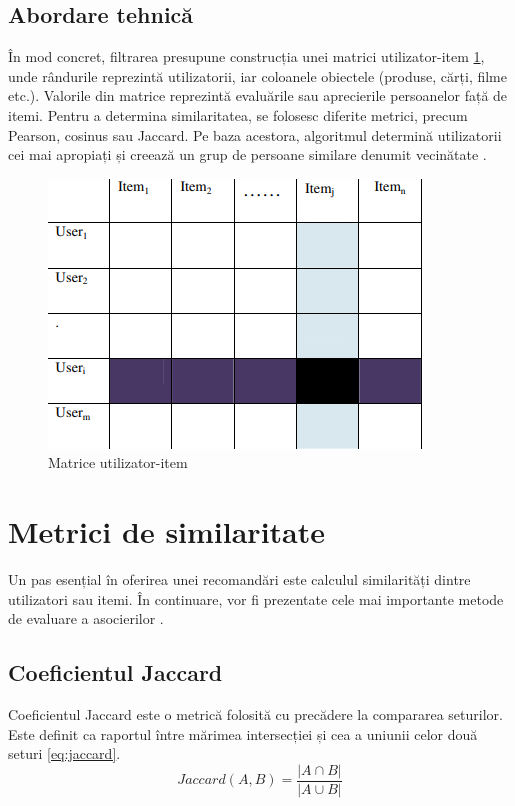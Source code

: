 \subsection{Abordare tehnică}
\label{subsec:ch3sec2sub1}
În mod concret, filtrarea presupune construcția unei matrici utilizator-item \ref{FigUserItemMatrix}, unde rândurile reprezintă utilizatorii, iar coloanele obiectele (produse, cărți, filme etc.). 
Valorile din matrice reprezintă evaluările sau aprecierile persoanelor față de itemi. Pentru a determina similaritatea, se folosesc diferite metrici, precum Pearson, cosinus sau Jaccard.
Pe baza acestora, algoritmul determină utilizatorii cei mai apropiați și creează un grup de persoane similare denumit vecinătate \cite{kumar2018recommendation}.
\begin{figure}[htbp]
	\centering
    \includegraphics[scale=1]{./figures/user-item-matrix.png}
	\caption{Matrice utilizator-item \cite{ISINKAYE2015261}}
	\label{FigUserItemMatrix}
\end{figure}


\section{Metrici de similaritate}
\label{sec:ch3sec3}
Un pas esențial în oferirea unei recomandări este calculul similarități dintre utilizatori sau itemi. 
În continuare, vor fi prezentate cele mai importante metode de evaluare a asocierilor \cite{sondur2016similarity}.

\subsection{Coeficientul Jaccard}
\label{subsec:ch3sec3sub1}
Coeficientul Jaccard \cite{bag2019efficient} este o metrică folosită cu precădere la compararea seturilor. 
Este definit ca raportul între mărimea intersecției și cea a uniunii celor două seturi \ref{eq:jaccard}.
\begin{equation}
    Jaccard(A, B) = \frac{|A \cap B|}{|A \cup B|}
    \label{eq:jaccard}
\end{equation}

